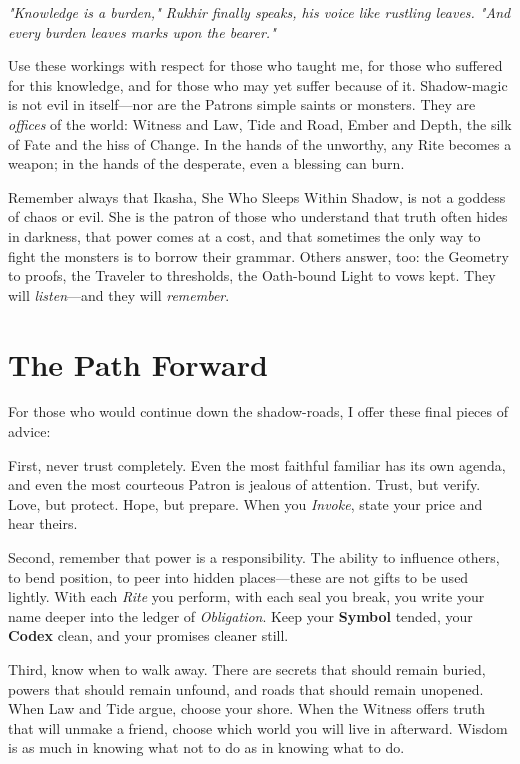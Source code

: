 \documentclass[12pt,twoside]{book}
\newcommand{\shadow}[1]{\textit{#1}}
\begin{document}
\shadow{"Knowledge is a burden," Rukhir finally speaks, his voice like rustling leaves. "And every burden leaves marks upon the bearer."}

Use these workings with respect for those who taught me, for those who suffered for this knowledge, and for those who may yet suffer because of it. Shadow-magic is not evil in itself—nor are the Patrons simple saints or monsters. They are \emph{offices} of the world: Witness and Law, Tide and Road, Ember and Depth, the silk of Fate and the hiss of Change. In the hands of the unworthy, any Rite becomes a weapon; in the hands of the desperate, even a blessing can burn.

Remember always that Ikasha, She Who Sleeps Within Shadow, is not a goddess of chaos or evil. She is the patron of those who understand that truth often hides in darkness, that power comes at a cost, and that sometimes the only way to fight the monsters is to borrow their grammar. Others answer, too: the Geometry to proofs, the Traveler to thresholds, the Oath-bound Light to vows kept. They will \emph{listen}—and they will \emph{remember}.

\section*{The Path Forward}

For those who would continue down the shadow-roads, I offer these final pieces of advice:

First, never trust completely. Even the most faithful familiar has its own agenda, and even the most courteous Patron is jealous of attention. Trust, but verify. Love, but protect. Hope, but prepare. When you \emph{Invoke}, state your price and hear theirs.

Second, remember that power is a responsibility. The ability to influence others, to bend position, to peer into hidden places—these are not gifts to be used lightly. With each \emph{Rite} you perform, with each seal you break, you write your name deeper into the ledger of \emph{Obligation}. Keep your \textbf{Symbol} tended, your \textbf{Codex} clean, and your promises cleaner still.

Third, know when to walk away. There are secrets that should remain buried, powers that should remain unfound, and roads that should remain unopened. When Law and Tide argue, choose your shore. When the Witness offers truth that will unmake a friend, choose which world you will live in afterward. Wisdom is as much in knowing what not to do as in knowing what to do.
\end{document}
